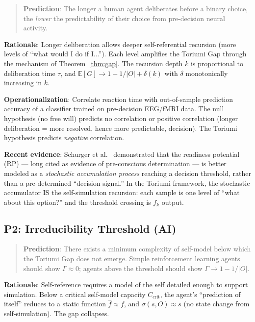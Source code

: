 \documentclass[12pt,a4paper]{article}
\theoremstyle{definition}
\theoremstyle{remark}
\newcommand{\E}{\mathbb{E}}
\begin{document}
\begin{quote}
\textbf{Prediction}: The longer a human agent deliberates before a binary
choice, the \emph{lower} the predictability of their choice from pre-decision
neural activity.
\end{quote}

\textbf{Rationale}: Longer deliberation allows deeper self-referential
recursion (more levels of ``what would I do if I...''). Each level amplifies
the Toriumi Gap through the mechanism of Theorem~\ref{thm:gap}. The recursion
depth $k$ is proportional to deliberation time $\tau$, and $\E[G] \to 1 -
1/|O| + \delta(k)$ with $\delta$ monotonically increasing in $k$.

\textbf{Operationalization}: Correlate reaction time with out-of-sample
prediction accuracy of a classifier trained on pre-decision EEG/fMRI data.
The null hypothesis (no free will) predicts no correlation or positive
correlation (longer deliberation = more resolved, hence more predictable,
decision). The Toriumi hypothesis predicts \emph{negative} correlation.

\textbf{Recent evidence}: Schurger et al.\ \cite{schurger2021} demonstrated
that the readiness potential (RP) --- long cited as evidence of pre-conscious
determination \cite{libet1983} --- is better modeled as a \emph{stochastic
accumulation process} reaching a decision threshold, rather than a
pre-determined ``decision signal.'' In the Toriumi framework, the stochastic
accumulator IS the self-simulation recursion: each sample is one level of
``what about this option?'' and the threshold crossing is $f_k$ output.

\subsection{P2: Irreducibility Threshold (AI)}

\begin{quote}
\textbf{Prediction}: There exists a minimum complexity of self-model below
which the Toriumi Gap does not emerge. Simple reinforcement learning agents
should show $\Gamma \approx 0$; agents above the threshold should show
$\Gamma \to 1 - 1/|O|$.
\end{quote}

\textbf{Rationale}: Self-reference requires a model of the self detailed
enough to support simulation. Below a critical self-model capacity
$C_{\text{crit}}$, the agent's ``prediction of itself'' reduces to a static
function $\hat{f} \approx f$, and $\sigma(s, O) \approx s$ (no state change
from self-simulation). The gap collapses.
\end{document}
